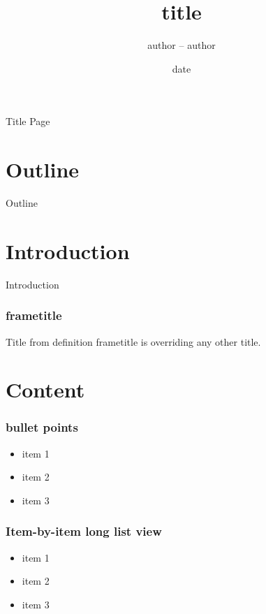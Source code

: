 
\usepackage{hyperref}

\usepackage{colortbl}

\usepackage{listings}

\title[substitute tile for the page bottom]{title}
\author{author -- author}
\date{date}



\begin{frame}[label=titlepage]{Title Page}
  \titlepage
\end{frame}

\section{Outline}
\begin{frame}{Outline}
  \tableofcontents
\end{frame}

\section{Introduction}
\begin{frame}{Introduction}
  \frametitle{frametitle}
  Title from definition frametitle is overriding any other title.
\end{frame}

\section{Content}

\begin{frame}
  \frametitle{bullet points}
  \begin{itemize}
  \item item 1
  \item item 2
  \item item 3
  \end{itemize}
\end{frame}

\begin{frame}
  \frametitle{Item-by-item long list view}
  \begin{itemize}[<+->]
  \item item 1
  \item item 2
  \item item 3
  \end{itemize}
\end{frame}

